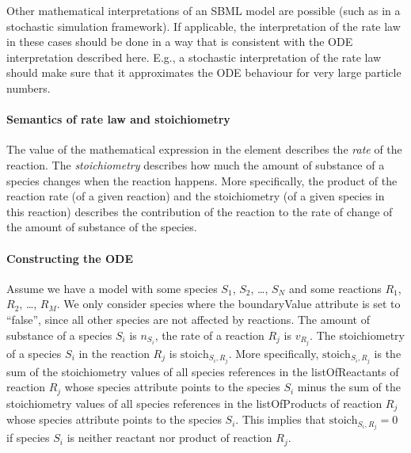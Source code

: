 Other mathematical interpretations of an SBML model are possible (such as in a
stochastic simulation framework). If applicable, the interpretation of the
rate law in these cases should be done in a way that is consistent with the 
ODE interpretation described here. E.g., a stochastic interpretation of the rate
law should make sure that it approximates the ODE behaviour for very large particle 
numbers. 

\paragraph{Semantics of rate law and stoichiometry}

The value of the mathematical expression in the  element describes the
\emph{rate} of the reaction. The \emph{stoichiometry} describes how much the amount
of substance of a species changes when the reaction happens. More specifically, 
the product of the reaction rate (of a given reaction) and the stoichiometry
(of a given species in this reaction)
describes the contribution of the reaction to the rate of change of the amount of 
substance of the species.

\paragraph{Constructing the ODE}

Assume we have a model with some species $S_{1}$, $S_{2}$, \ldots{},
$S_{N}$ and some reactions $R_{1}$, $R_{2}$, \ldots{}, $R_{M}$.
We only consider species where the {boundaryValue} attribute is set
to {}``false'', since all other species are not affected by reactions.
The amount of substance of a species $S_{i}$ is $n_{S_{i}}$, the
rate of a reaction $R_{j}$ is $v_{R_{j}}$. The stoichiometry of
a species $S_{i}$ in the reaction $R_{j}$ is $\text{stoich}{}_{S_{i},R_{j}}$.
More specifically, $\textrm{stoich}_{S_{i},R_{j}}$ is the sum of
the stoichiometry values of all species references in the listOfReactants
of reaction $R_{j}$ whose species attribute points to the species
$S_{i}$ minus the sum of the stoichiometry values of all species
references in the listOfProducts of reaction $R_{j}$ whose species
attribute points to the species $S_{i}$. This implies that $\textrm{stoich}_{S_{i},R_{j}}=0$
if species $S_{i}$ is neither reactant nor product of reaction $R_{j}$.

